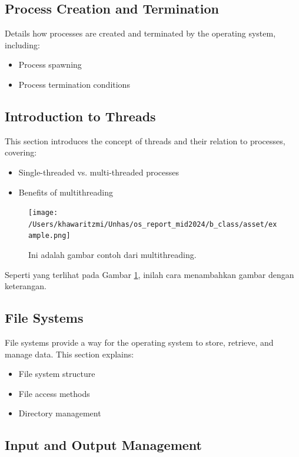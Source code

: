 \documentclass[12pt]{article}
\begin{document}
\subsection{Process Creation and Termination}
Details how processes are created and terminated by the operating system, including:
\begin{itemize}
    \item Process spawning
    \item Process termination conditions
\end{itemize}

\subsection{Introduction to Threads}
This section introduces the concept of threads and their relation to processes, covering:
\begin{itemize}
    \item Single-threaded vs. multi-threaded processes
    \item Benefits of multithreading
\end{itemize}

\begin{figure}[h]
    \centering
    \texttt{[image: /Users/khawaritzmi/Unhas/os\_report\_mid2024/b\_class/asset/example.png]}  %
    \caption{Ini adalah gambar contoh dari multithreading.}
    \label{fig:contoh_gambar}
\end{figure}

Seperti yang terlihat pada Gambar \ref{fig:contoh_gambar}, inilah cara menambahkan gambar dengan keterangan.

\subsection{File Systems}
File systems provide a way for the operating system to store, retrieve, and manage data. This section explains:
\begin{itemize}
    \item File system structure
    \item File access methods
    \item Directory management
\end{itemize}

\subsection{Input and Output Management}
\end{document}
